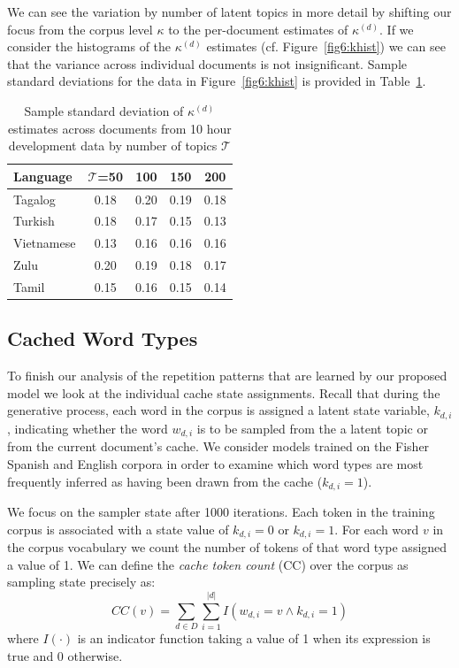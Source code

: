 We can see the variation by number of latent topics in more detail by shifting our focus from the corpus level $\kappa$ to the per-document estimates of $\kappa^{(d)}$.   If we consider the histograms of the $\kappa^{(d)}$ estimates (cf. Figure~\ref{fig6:khist}) we can see that the variance across individual documents is not insignificant.  Sample standard deviations for the data in Figure~\ref{fig6:khist} is provided in Table~\ref{kappasStdDev}.

\begin{table}[t]
\begin{center}
   \begin{tabular}{lcccc}
   \textbf{Language}  & $\mathbf{\mathcal{T}}$\textbf{=50} & \textbf{100} & \textbf{150} & \textbf{200} \\ \midrule
     Tagalog &  0.18 & 0.20 & 0.19 & 0.18 \\
     Turkish &  0.18 & 0.17 & 0.15 & 0.13 \\
     Vietnamese & 0.13 & 0.16 & 0.16 & 0.16 \\
     Zulu & 0.20 & 0.19 & 0.18 & 0.17 \\
     Tamil &  0.15 & 0.16 & 0.15 & 0.14 \\ \bottomrule
        \end{tabular}
\caption[Sample std. dev. of $\kappa^{(d)}$ estimates across documents ]{Sample standard deviation of $\kappa^{(d)}$ estimates across documents from 10 hour development data by number of topics $\mathcal{T}$\label{kappasStdDev}}
\end{center}
\end{table}   


\subsection{Cached Word Types}
To finish our analysis of the repetition patterns that are learned by our proposed model we look at the individual cache state assignments.  Recall that during the generative process, each word in the corpus is assigned a latent state variable, $k_{d,i}$, indicating whether the word $w_{d,i}$ is to be sampled from the a latent topic or from the current document's cache.  We consider models trained on the Fisher Spanish and English corpora in order to examine which word types are most frequently inferred as having been drawn from the cache ($k_{d,i}=1$).

We focus on the sampler state after 1000 iterations.  Each token in the training corpus is associated with a state value of $k_{d,i}=0$ or $k_{d,i}=1$.  For each word $v$ in the corpus vocabulary we count the number of tokens of that word type assigned a value of 1.  We can define the \textit{cache token count} (CC) over the corpus as sampling state precisely as:
\begin{equation}
CC(v) = \sum_{d\in D}\sum_{i=1}^{|d|} I(w_{d,i}=v \land k_{d,i}=1)
\end{equation}
\noindent where $I(\cdot)$ is an indicator function taking a value of 1 when its expression is true and 0 otherwise.  

